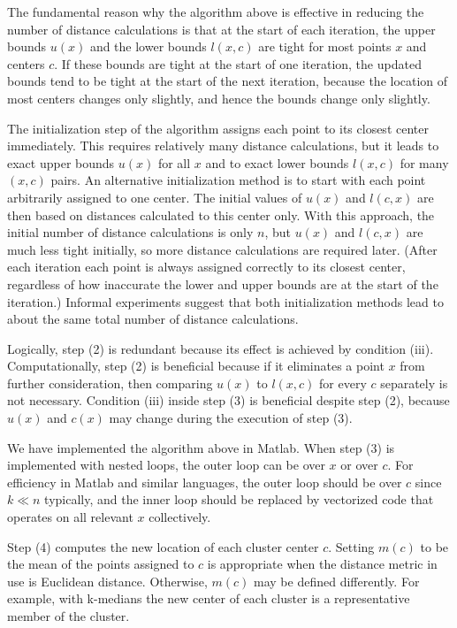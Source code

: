 The fundamental reason why the algorithm above is effective in reducing the number of distance calculations is that at the start of each iteration, the upper bounds \( u(x) \) and the lower bounds \( l(x, c) \) are tight for most points \( x \) and centers \( c \). If these bounds are tight at the start of one iteration, the updated bounds tend to be tight at the start of the next iteration, because the location of most centers changes only slightly, and hence the bounds change only slightly.

The initialization step of the algorithm assigns each point to its closest center immediately. This requires relatively many distance calculations, but it leads to exact upper bounds \( u(x) \) for all \( x \) and to exact lower bounds \( l(x, c) \) for many \( (x, c) \) pairs. An alternative initialization method is to start with each point arbitrarily assigned to one center. The initial values of \( u(x) \) and \( l(c, x) \) are then based on distances calculated to this center only. With this approach, the initial number of distance calculations is only \( n \), but \( u(x) \) and \( l(c, x) \) are much less tight initially, so more distance calculations are required later. (After each iteration each point is always assigned correctly to its closest center, regardless of how inaccurate the lower and upper bounds are at the start of the iteration.) Informal experiments suggest that both initialization methods lead to about the same total number of distance calculations.

Logically, step (2) is redundant because its effect is achieved by condition (iii). Computationally, step (2) is beneficial because if it eliminates a point \( x \) from further consideration, then comparing \( u(x) \) to \( l(x, c) \) for every \( c \) separately is not necessary. Condition (iii) inside step (3) is beneficial despite step (2), because \( u(x) \) and \( c(x) \) may change during the execution of step (3).

We have implemented the algorithm above in Matlab. When step (3) is imp\-le\-men\-ted with nested loops, the outer loop can be over \( x \) or over \( c \). For efficiency in Matlab and similar languages, the outer loop should be over \( c \) since \( k \ll n \) typically, and the inner loop should be replaced by vectorized code that operates on all relevant \( x \) collectively.

Step (4) computes the new location of each cluster center \( c \). Setting \( m(c) \) to be the mean of the points assigned to \( c \) is appropriate when the distance metric in use is Euclidean distance. Otherwise, \( m(c) \) may be defined differently. For example, with k-medians the new center of each cluster is a representative member of the cluster.

